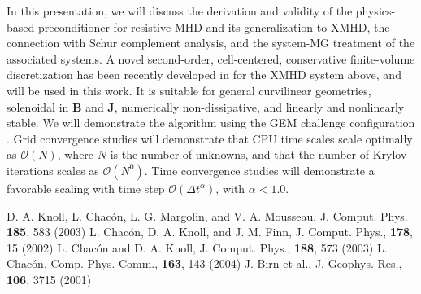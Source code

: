 \documentclass{report}
\begin{document}
In this presentation, we will discuss the derivation and validity
of the physics-based preconditioner for resistive MHD and its generalization
to XMHD, the connection with Schur complement analysis, and the system-MG
treatment of the associated systems. A novel second-order, cell-centered,
conservative finite-volume discretization has been recently developed
in \cite{chacon-cpc-04} for the XMHD system above, and will be used
in this work. It is suitable for general curvilinear geometries, solenoidal
in $\mathbf{B}$ and $\mathbf{J}$, numerically non-dissipative, and
linearly and nonlinearly stable. We will demonstrate the algorithm
using the GEM challenge configuration \cite{gem}. Grid convergence
studies will demonstrate that CPU time scales scale optimally as $\mathcal{O}(N)$,
where $N$ is the number of unknowns, and that the number of Krylov
iterations scales as $\mathcal{O}(N^{0})$. Time convergence studies
will demonstrate a favorable scaling with time step $\mathcal{O}(\Delta t^{\alpha })$,
with $\alpha <1.0$.

\begin{thebibliography}{1}
D. A. Knoll, L. Chac\'{o}n, L. G. Margolin, and V. A. Mousseau, J.
Comput. Phys. \textbf{185}, 583 (2003)
 \vspace{-8pt} L. Chac\'{o}n, D. A. Knoll, and J.
M. Finn, J. Comput.
Phys., \textbf{178}, 15 (2002)
 \vspace{-8pt} L. Chac\'{o}n and D. A. Knoll, J. Comput. Phys.,
\textbf{188}, 573 (2003)
 \vspace{-8pt} L. Chac\'{o}n, Comp. Phys. Comm., \textbf{163}, 143
(2004)
 \vspace{-8pt} J. Birn et al., J. Geophys. Res., \textbf{106}, 3715
(2001)\end{thebibliography}
\end{document}
